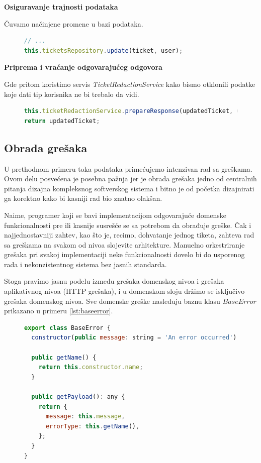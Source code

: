\documentclass[12pt,oneside]{memoir}
\begin{document}
\textbf{Osiguravanje trajnosti podataka}

Čuvamo načinjene promene u bazi podataka.
\begin{figure}[h]
\begin{lstlisting}[language=JavaScript, style=ES6, caption={Korak očuvanja trajnosti podataka.}]
// ...
this.ticketsRepository.update(ticket, user);
\end{lstlisting}
\end{figure}

\newpage
\textbf{Priprema i vraćanje odgovarajućeg odgovora}

Gde pritom koristimo servis \textit{TicketRedactionService} kako bismo otklonili podatke koje dati tip korisnika ne bi trebalo da vidi.
\begin{figure}[h]
\begin{lstlisting}[language=JavaScript, style=ES6, caption={Korak pripreme i vraćanja odgovora.}]
this.ticketRedactionService.prepareResponse(updatedTicket, user);
return updatedTicket;
\end{lstlisting}
\end{figure}

\newpage
\subsection{Obrada grešaka}

U prethodnom primeru toka podataka primećujemo intenzivan rad sa greškama. Ovom delu posvećena je posebna pažnja jer je obrada grešaka jedno od centralnih pitanja dizajna kompleksnog softverskog sistema i bitno je od početka dizajnirati ga korektno kako bi kasniji rad bio znatno olakšan.

Naime, programer koji se bavi implementacijom odgovarajuće domenske funkcionalnosti pre ili kasnije susrešće se sa potrebom da obrađuje greške. Čak i najjednostavniji zahtev, kao što je, recimo, dohvatanje jednog tiketa, zahteva rad sa greškama na svakom od nivoa slojevite arhitekture. Manuelno orkestriranje grešaka pri svakoj implementaciji neke funkcionalnosti dovelo bi do usporenog rada i nekonzistentnog sistema bez jasnih standarda. 

Stoga pravimo jasnu podelu između grešaka domenskog nivoa i grešaka aplikativnog nivoa (HTTP grešaka), i u domenskom sloju držimo se isključivo grešaka domenskog nivoa. Sve domenske greške nasleđuju baznu klasu $BaseError$ prikazano u primeru \ref{lst:baseerror}.

\begin{figure}[h]
\begin{lstlisting}[language=JavaScript, style=ES6, caption={BaseError.ts}, label={lst:baseerror}]
export class BaseError {
  constructor(public message: string = 'An error occurred') {}

  public getName() {
    return this.constructor.name;
  }

  public getPayload(): any {
    return {
      message: this.message,
      errorType: this.getName(),
    };
  }
}
\end{lstlisting}
\end{figure}
\end{document}

